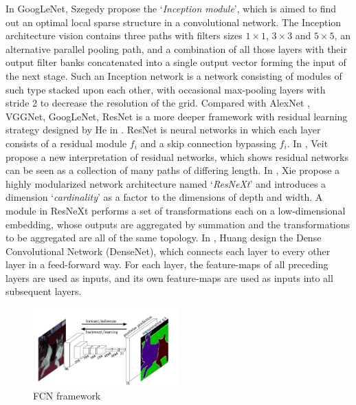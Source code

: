 In GoogLeNet\cite{Szegedy-GoogLeNet}, Szegedy \etal propose the `\emph{Inception module}', which is aimed to find out an optimal local sparse structure in a convolutional network. The Inception architecture vision contains three paths with filters sizes $1 \times 1$, $3 \times 3$ and $5\times 5$, an alternative parallel pooling path, and a combination of all those layers with their output filter banks concatenated into a single output vector forming the input of the next stage.
Such an Inception network is a network consisting of modules of such type stacked upon each other, with occasional max-pooling layers with stride 2 to decrease the resolution of the grid.
Compared with AlexNet \cite{Krizhevsky2012ImageNet}, VGGNet\cite{Simonyan-VGG}, GoogLeNet\cite{Szegedy-GoogLeNet}, ResNet is a more deeper framework with residual learning strategy designed by He \etal in \cite{He-Resnet}. ResNet is neural networks in which each layer consists of a residual module $f_i$ and a skip connection bypassing $f_i$.
In \cite{veit2016residual}, Veit \etal propose a new interpretation of residual networks, which shows residual networks can be seen as a collection of many paths of differing length.
In \cite{xie2017aggregated}, Xie \etal propose a highly modularized network architecture named `\emph{ResNeXt}' and introduces a dimension `\emph{cardinality}' as a factor to the dimensions of depth and width. A module in ResNeXt performs a set of transformations each on a low-dimensional embedding, whose outputs are aggregated by summation and the transformations to be aggregated are all of the same topology.
In \cite{huang2016densely}, Huang \etal design the Dense Convolutional Network (DenseNet), which connects each layer
to every other layer in a feed-forward way. For each layer, the feature-maps of all preceding layers are used as inputs, and its own feature-maps are used as inputs into all subsequent layers.

\begin{figure}[ht]
    \centering
    \includegraphics[width=0.5\textwidth]{./figure/FCN.png}
    \caption{FCN framework}
    \label{FCN}
\end{figure}

